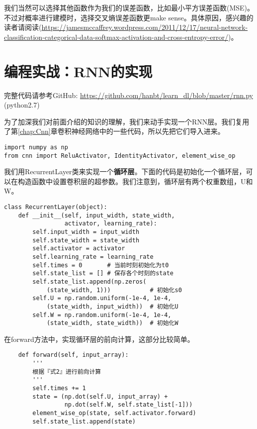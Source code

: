 我们当然可以选择其他函数作为我们的误差函数，比如最小平方误差函数(MSE)。不过对概率进行建模时，选择交叉熵误差函数更make sense。具体原因，感兴趣的读者请阅读(\url{https://jamesmccaffrey.wordpress.com/2011/12/17/neural-network-classification-categorical-data-softmax-activation-and-cross-entropy-error/})。




\section{编程实战：RNN的实现}\label{Rnn:14}

\begin{note}
	完整代码请参考GitHub: \url{https://github.com/hanbt/learn_dl/blob/master/rnn.py}
	(python2.7)
\end{note}

为了加深我们对前面介绍的知识的理解，我们来动手实现一个RNN层。我们复用了第\ref{chap:Cnn}章卷积神经网络中的一些代码，所以先把它们导入进来。
\begin{lstlisting}
import numpy as np
from cnn import ReluActivator, IdentityActivator, element_wise_op
\end{lstlisting}

我们用RecurrentLayer类来实现一个\textbf{循环层}。下面的代码是初始化一个循环层，可以在构造函数中设置卷积层的超参数。我们注意到，循环层有两个权重数组，U和W。
\begin{lstlisting}
class RecurrentLayer(object):
    def __init__(self, input_width, state_width,
                 activator, learning_rate):
        self.input_width = input_width
        self.state_width = state_width
        self.activator = activator
        self.learning_rate = learning_rate
        self.times = 0       # 当前时刻初始化为t0
        self.state_list = [] # 保存各个时刻的state
        self.state_list.append(np.zeros(
            (state_width, 1)))           # 初始化s0
        self.U = np.random.uniform(-1e-4, 1e-4,
            (state_width, input_width))  # 初始化U
        self.W = np.random.uniform(-1e-4, 1e-4,
            (state_width, state_width))  # 初始化W
\end{lstlisting}

在forward方法中，实现循环层的前向计算，这部分比较简单。
\begin{lstlisting}
    def forward(self, input_array):
        '''
        根据『式2』进行前向计算
        '''
        self.times += 1
        state = (np.dot(self.U, input_array) +
                 np.dot(self.W, self.state_list[-1]))
        element_wise_op(state, self.activator.forward)
        self.state_list.append(state)
\end{lstlisting}

